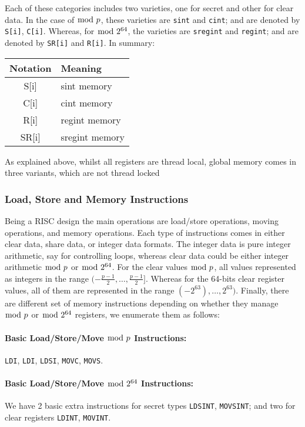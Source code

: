 Each of these categories includes two varieties, one for secret and other for clear data.
In the case of $\bmod \; p$, these varieties are \verb+sint+ and \verb+cint+; and are denoted by \verb+S[i]+, \verb+C[i]+. Whereas, for $\bmod \; 2^{64}$, the varieties are \verb+sregint+ and
\verb+regint+; and are denoted by \verb+SR[i]+ and \verb+R[i]+.
In summary:
\begin{center}
\begin{tabular}{|c|l|}
\hline
Notation & Meaning \\
\hline
    S[i]  & sint memory \\
    C[i]  & cint memory \\
    R[i]  & regint memory \\
    SR[i] & sregint memory \\
\hline
\end{tabular}
\end{center}
As explained above, whilst all registers are thread local,
global memory comes in three variants, which are not thread locked

\subsubsection{Load, Store and Memory Instructions}
Being a RISC design the main operations are load/store
operations, moving operations, and memory operations.
Each type of instructions comes in either clear data,
share data, or integer data formats.
The integer data is pure integer arithmetic, say
for controlling loops, whereas clear data could be either integer
arithmetic $\bmod \; p$ or $\bmod \; 2^{64}$.
For the clear values  $\bmod \; p$, all values represented as integers
in the range $(-\frac{p-1}{2}, \dots, \frac{p-1}{2}]$.
Whereas for the 64-bits clear register values, all of them are represented
in the range $(-2^{63}), \dots, 2^{63})$.
Finally, there are different set of memory instructions depending on whether they manage $\bmod \; p$ or $\bmod \; 2^{64}$ registers, we enumerate them as follows:

\paragraph{Basic Load/Store/Move  $\bmod \; p$ Instructions:}
\verb+LDI+,
\verb+LDI+,
\verb+LDSI+,
\verb+MOVC+,
\verb+MOVS+.


\paragraph{Basic Load/Store/Move $\bmod \; 2^{64}$ Instructions:}
We have 2 basic extra instructions for secret types \verb+LDSINT+,
\verb+MOVSINT+; and two for clear registers \verb+LDINT+, \verb+MOVINT+.

